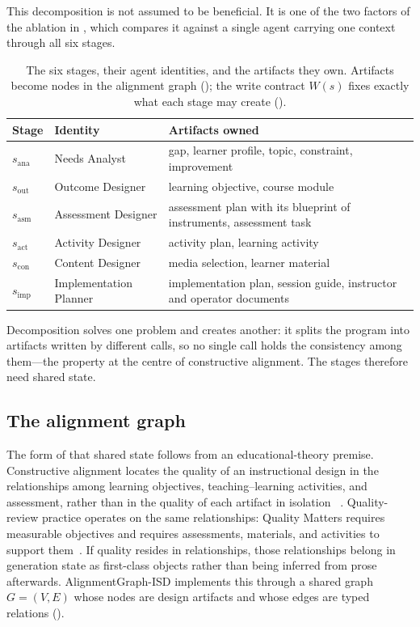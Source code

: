 This decomposition is not assumed to be beneficial. It is one of the two factors
of the ablation in , which compares it against a single agent
carrying one context through all six stages.

\begin{table}[t]
  \caption{The six stages, their agent identities, and the artifacts they own.
  Artifacts become nodes in the alignment graph (); the write
  contract $W(s)$ fixes exactly what each stage may create
  ().}
  \label{tab:specialists}
  \small
  \begin{tabular}{@{}lp{}p{}@{}}
    \toprule
    Stage & Identity & Artifacts owned \\
    \midrule
    $s_{\mathrm{ana}}$ & Needs Analyst & gap, learner profile, topic,
    constraint, improvement \\
    $s_{\mathrm{out}}$ & Outcome Designer & learning objective, course module \\
    $s_{\mathrm{asm}}$ & Assessment Designer & assessment plan with its blueprint
    of instruments, assessment task \\
    $s_{\mathrm{act}}$ & Activity Designer & activity plan, learning activity \\
    $s_{\mathrm{con}}$ & Content Designer & media selection, learner material \\
    $s_{\mathrm{imp}}$ & Implementation Planner & implementation plan, session
    guide, instructor and operator documents \\
    \bottomrule
  \end{tabular}
\end{table}

Decomposition solves one problem and creates another: it splits the program into
artifacts written by different calls, so no single call holds the consistency among
them---the property at the centre of constructive alignment. The stages therefore
need shared state.

\subsection{The alignment graph}
\label{sec:alignment-graph}

The form of that shared state follows from an educational-theory premise.
Constructive alignment locates the quality of an instructional design in the
relationships among learning objectives, teaching--learning activities, and
assessment, rather than in the quality of each artifact in isolation
~\cite{biggs1996enhancing,biggs2011teaching}. Quality-review practice operates on
the same relationships: Quality Matters requires measurable objectives and requires
assessments, materials, and activities to support them~\cite{qm2018rubric}. If
quality resides in relationships, those relationships belong in generation state as
first-class objects rather than being inferred from prose afterwards.
AlignmentGraph-ISD implements this through a shared graph $G=(V,E)$ whose nodes are
design artifacts and whose edges are typed relations ().

